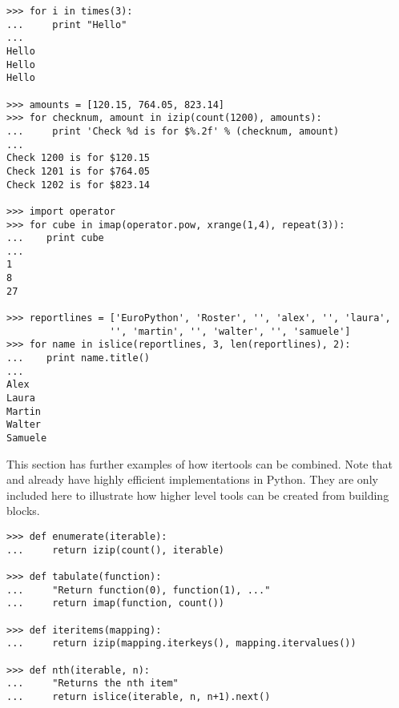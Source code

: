 \begin{verbatim}
>>> for i in times(3):
...     print "Hello"
...
Hello
Hello
Hello

>>> amounts = [120.15, 764.05, 823.14]
>>> for checknum, amount in izip(count(1200), amounts):
...     print 'Check %d is for $%.2f' % (checknum, amount)
...
Check 1200 is for $120.15
Check 1201 is for $764.05
Check 1202 is for $823.14

>>> import operator
>>> for cube in imap(operator.pow, xrange(1,4), repeat(3)):
...    print cube
...
1
8
27

>>> reportlines = ['EuroPython', 'Roster', '', 'alex', '', 'laura',
                  '', 'martin', '', 'walter', '', 'samuele']
>>> for name in islice(reportlines, 3, len(reportlines), 2):
...    print name.title()
...
Alex
Laura
Martin
Walter
Samuele

\end{verbatim}

This section has further examples of how itertools can be combined.
Note that  and  already
have highly efficient implementations in Python.  They are only
included here to illustrate how higher level tools can be created
from building blocks.

\begin{verbatim}
>>> def enumerate(iterable):
...     return izip(count(), iterable)

>>> def tabulate(function):
...     "Return function(0), function(1), ..."
...     return imap(function, count())

>>> def iteritems(mapping):
...     return izip(mapping.iterkeys(), mapping.itervalues())

>>> def nth(iterable, n):
...     "Returns the nth item"
...     return islice(iterable, n, n+1).next()

\end{verbatim}
